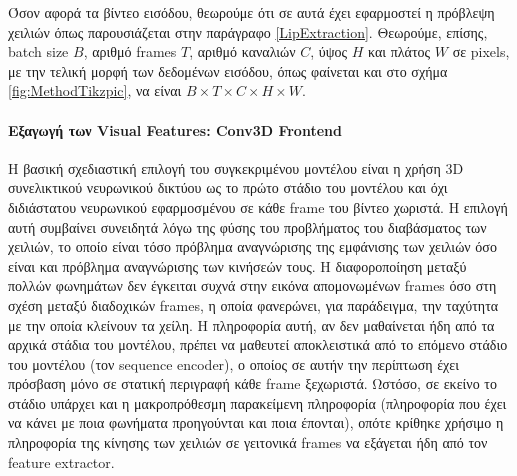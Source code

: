 Όσον αφορά τα βίντεο εισόδου, θεωρούμε ότι σε αυτά έχει εφαρμοστεί η πρόβλεψη χειλιών όπως παρουσιάζεται στην παράγραφο \ref{LipExtraction}. Θεωρούμε, επίσης, batch size $B$, αριθμό frames $T$, αριθμό καναλιών $C$, ύψος $H$ και πλάτος $W$ σε pixels, με την τελική μορφή των δεδομένων εισόδου, όπως φαίνεται και στο σχήμα \ref{fig:MethodTikzpic}, να είναι $B \times T \times C \times H \times W$.

\paragraph{Εξαγωγή των Visual Features: Conv3D Frontend}

Η βασική σχεδιαστική επιλογή του συγκεκριμένου μοντέλου είναι η χρήση 3D συνελικτικού νευρωνικού δικτύου ως το πρώτο στάδιο του μοντέλου και όχι διδιάστατου νευρωνικού εφαρμοσμένου σε κάθε frame του βίντεο χωριστά. Η επιλογή αυτή συμβαίνει συνειδητά λόγω της φύσης του προβλήματος του διαβάσματος των χειλιών, το οποίο είναι τόσο πρόβλημα αναγνώρισης της εμφάνισης των χειλιών όσο είναι και πρόβλημα αναγνώρισης των κινήσεών τους. Η διαφοροποίηση μεταξύ πολλών φωνημάτων δεν έγκειται συχνά στην εικόνα απομονωμένων frames όσο στη σχέση μεταξύ διαδοχικών frames, η οποία φανερώνει, για παράδειγμα, την ταχύτητα με την οποία κλείνουν τα χείλη. Η πληροφορία αυτή, αν δεν μαθαίνεται ήδη από τα αρχικά στάδια του μοντέλου, πρέπει να μαθευτεί αποκλειστικά από το επόμενο στάδιο του μοντέλου (τον sequence encoder), ο οποίος σε αυτήν την περίπτωση έχει πρόσβαση μόνο σε στατική περιγραφή κάθε frame ξεχωριστά. Ωστόσο, σε εκείνο το στάδιο υπάρχει και η μακροπρόθεσμη παρακείμενη πληροφορία (πληροφορία που έχει να κάνει με ποια φωνήματα προηγούνται και ποια έπονται), οπότε κρίθηκε χρήσιμο η πληροφορία της κίνησης των χειλιών σε γειτονικά frames να εξάγεται ήδη από τον feature extractor.

